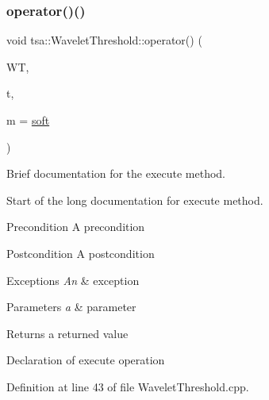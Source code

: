 \subsubsection{\texorpdfstring{operator()()}{operator()()}\hspace{0.1cm}{\footnotesize\ttfamily [1/2]}}
{\footnotesize\ttfamily void tsa\+::\+Wavelet\+Threshold\+::operator() (\begin{DoxyParamCaption}\item[{\hyperlink{namespacetsa_ac599574bcc094eda25613724b8f3ca9e}{Seq\+View\+Double} \&}]{WT,  }\item[{enum \hyperlink{classtsa_1_1_wavelet_threshold_a50c42c95dae960986a985157ca038fae}{Wavelet\+Thresholding}}]{t,  }\item[{enum \hyperlink{classtsa_1_1_wavelet_threshold_a93d14df024bbc8c3da182bf5899f8f83}{Thresholding\+Mode}}]{m = {\ttfamily \hyperlink{classtsa_1_1_wavelet_threshold_a93d14df024bbc8c3da182bf5899f8f83a356244854a142af0e9f3db2cf4ad5192}{soft}} }\end{DoxyParamCaption})}



Brief documentation for the execute method. 

Start of the long documentation for execute method.

\begin{DoxyPrecond}{Precondition}
A precondition 
\end{DoxyPrecond}
\begin{DoxyPostcond}{Postcondition}
A postcondition 
\end{DoxyPostcond}

\begin{DoxyExceptions}{Exceptions}
{\em An} & exception\\
\hline
\end{DoxyExceptions}

\begin{DoxyParams}{Parameters}
{\em a} & parameter\\
\hline
\end{DoxyParams}
\begin{DoxyReturn}{Returns}
a returned value
\end{DoxyReturn}
Declaration of execute operation 

Definition at line 43 of file Wavelet\+Threshold.\+cpp.

\mbox{\label{classtsa_1_1_wavelet_threshold_ae05f0886ef54f3370fc5c91eff2b0de7}} 
